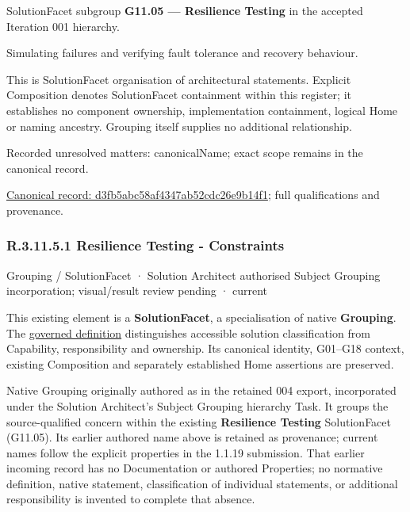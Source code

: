 SolutionFacet subgroup \textbf{G11.05 — Resilience Testing} in the accepted Iteration 001 hierarchy.



Simulating failures and verifying fault tolerance and recovery behaviour.



This is SolutionFacet organisation of architectural statements. Explicit Composition denotes SolutionFacet containment within this register; it establishes no component ownership, implementation containment, logical Home or naming ancestry. Grouping itself supplies no additional relationship.


{\small Recorded unresolved matters: canonicalName; exact scope remains in the canonical record.}\par
{\footnotesize \href{../../../../../../../continuum/grouping/d3fb5abc58af4347ab52cdc26e9b14f1.md}{Canonical record: d3fb5abc58af4347ab52cdc26e9b14f1}; full qualifications and provenance.}\par
\subsubsection*{R.3.11.5.1 Resilience Testing - Constraints}
\label{navigation:R.3.11.5.1}

\label{element:82837737622a46059703e99a8920533e}
{\small Grouping / SolutionFacet · Solution Architect authorised Subject Grouping incorporation; visual/result review pending · current}\par

This existing element is a \textbf{SolutionFacet}, a specialisation of native
\textbf{Grouping}. The \href{\detokenize{../../../../../../../governance/continuum-representation.md#solutionfacet-classification--1119-candidate}}{governed definition}
distinguishes accessible solution classification from Capability, responsibility
and ownership. Its canonical identity, G01–G18 context, existing Composition
and separately established Home assertions are preserved.



Native Grouping originally authored as \texttt{} in the retained 004 export,
incorporated under the Solution Architect's Subject Grouping hierarchy Task.
It groups the source-qualified \texttt{} concern within
the existing \textbf{Resilience Testing} SolutionFacet (G11.05). Its earlier authored name above is retained as provenance; current names
follow the explicit properties in the 1.1.19 submission.
That earlier incoming record has no Documentation or authored Properties; no normative
definition, native statement, classification of individual statements, or
additional responsibility is invented to complete that absence.



